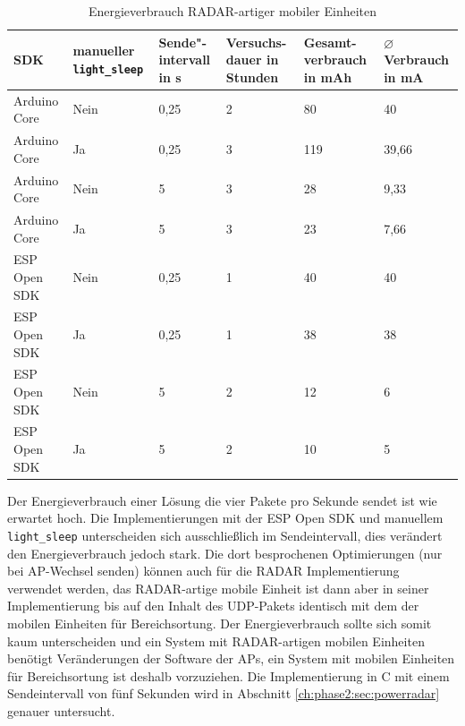 \begin{table}[h]
	\centering
	\caption{Energieverbrauch RADAR-artiger mobiler Einheiten}
	\label{table:radarconsumption}
	\begin{tabular}{p{3cm}|p{2.2cm}|p{1.5cm}|p{2cm}|p{2cm}|p{2cm}}
		SDK & manueller \texttt{light\_sleep} & Sende"-intervall in s & Versuchs-dauer in Stunden & Gesamt-verbrauch in mAh & $\varnothing$ Verbrauch in mA \\
		\hline
		Arduino Core & Nein & 0,25 & 2 & 80 & 40 \\
		Arduino Core & Ja & 0,25 & 3 & 119 & 39,66 \\
		Arduino Core & Nein & 5 & 3 & 28 & 9,33 \\
		Arduino Core & Ja & 5 & 3 & 23 & 7,66 \\
		ESP Open SDK & Nein & 0,25 & 1 & 40 & 40 \\
		ESP Open SDK & Ja & 0,25 & 1 & 38 & 38 \\
		ESP Open SDK & Nein & 5 & 2 & 12 & 6 \\
		ESP Open SDK & Ja & 5 & 2 & 10 & 5 \\
	\end{tabular}
\end{table}

Der Energieverbrauch einer Lösung die vier Pakete pro Sekunde sendet ist wie erwartet hoch.
Die Implementierungen mit der ESP Open SDK und manuellem \texttt{light\_sleep} unterscheiden sich ausschließlich im Sendeintervall, dies verändert den Energieverbrauch jedoch stark.
Die dort besprochenen Optimierungen (nur bei AP-Wechsel senden) können auch für die RADAR Implementierung verwendet werden, das RADAR-artige mobile Einheit ist dann aber in seiner Implementierung bis auf den Inhalt des UDP-Pakets identisch mit dem der mobilen Einheiten für Bereichsortung.
Der Energieverbrauch sollte sich somit kaum unterscheiden und ein System mit RADAR-artigen mobilen Einheiten benötigt Veränderungen der Software der APs, ein System mit mobilen Einheiten für Bereichsortung ist deshalb vorzuziehen. 
Die Implementierung in C mit einem Sendeintervall von fünf Sekunden wird in Abschnitt \ref{ch:phase2:sec:powerradar} genauer untersucht.

